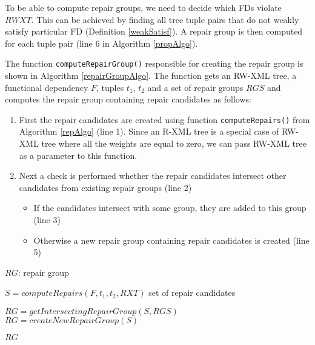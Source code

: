 To be able to compute repair groups, we need to decide which FDs violate $RWXT$. This can be achieved by finding all tree tuple pairs that do not weakly satisfy particular FD (Definition \ref{weakSatisf}). A repair group is then computed for each tuple pair (line 6 in Algorithm \ref{propAlgo}).

The function \texttt{computeRepairGroup()} responsible for creating the repair group is shown in Algorithm \ref{repairGroupAlgo}. The function gets an RW-XML tree, a functional dependency $F$, tuples $t_1$, $t_2$ and a set of repair groups $RGS$ and computes the repair group containing repair candidates as follows:

\begin{enumerate}
	\item First the repair candidates are created using function \texttt{computeRepairs()} from Algorithm \ref{repAlgo} (line 1). Since an R-XML tree is a special case of RW-XML tree where all the weights are equal to zero, we can pass RW-XML tree as a parameter to this function.
    \item Next a check is performed whether the repair candidates intersect other candidates from existing repair groups (line 2)
    \begin{itemize}
    	\item If the candidates intersect with some group, they are added to this group (line 3)
        \item Otherwise a new repair group containing repair candidates is created (line 5)
    \end{itemize}
\end{enumerate}

\begin{algorithm}
\caption{$computeRepairGroup(F, t_1, t_2, RXT, RGS)$}
\label{repairGroupAlgo}
\begin{algorithmic}[1]
\ENSURE $RG$: repair group

\STATE $S = computeRepairs(F, t_1, t_2, RXT)$ \COMMENT set of repair candidates

\STATE $RG = getIntersectingRepairGroup(S, RGS)$
\ELSE
\STATE $RG = createNewRepairGroup(S)$
\ENDIF

\RETURN $RG$
\end{algorithmic}
\end{algorithm}

